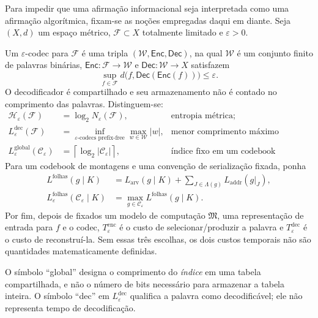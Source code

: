 Para impedir que uma afirmação informacional seja interpretada como uma
afirmação algorítmica, fixam-se as noções empregadas daqui em diante. Seja
$(X,d)$ um espaço métrico, $\mathcal F\subset X$ totalmente limitado e
$\varepsilon>0$.

\begin{definition}\label{map:artigo_2:3.19}\label{artigo_2:def:coding-resources}
Um $\varepsilon$-codec para $\mathcal F$ é uma tripla
$(\mathcal W,\mathsf{Enc},\mathsf{Dec})$, na qual $\mathcal W$ é um conjunto
finito de palavras binárias, $\mathsf{Enc}:\mathcal F\to\mathcal W$ e
$\mathsf{Dec}:\mathcal W\to X$ satisfazem
\[
 \sup_{f\in\mathcal F}d\bigl(f,\mathsf{Dec}(\mathsf{Enc}(f))\bigr)
 \le\varepsilon.
\]
O decodificador é compartilhado e seu armazenamento não é contado no
comprimento das palavras. Distinguem-se:
\begin{align*}
 \mathcal H_\varepsilon(\mathcal F)
  &=\log_2N_\varepsilon(\mathcal F),
  &&\text{entropia métrica;}\\
 L_\varepsilon^{\mathrm{dec}}(\mathcal F)
  &=\inf_{\text{$\varepsilon$-codecs prefix-free}}
    \max_{w\in\mathcal W}|w|,
  &&\text{menor comprimento máximo decodificável;}\\
 L_\varepsilon^{\mathrm{global}}(\mathcal C_\varepsilon)
  &=\left\lceil\log_2|\mathcal C_\varepsilon|\right\rceil,
  &&\text{índice fixo em um codebook compartilhado.}
\end{align*}
Para um codebook de montagens e uma convenção de serialização fixada, ponha
\begin{align*}
 L^{\mathrm{folhas}}(g\mid K)
   &=L_{\mathrm{arv}}(g\mid K)
     +\sum_{J\in\Lambda(g)}L_{\mathrm{addr}}(g|_J),\\
 L_\varepsilon^{\mathrm{folhas}}(\mathcal C_\varepsilon\mid K)
   &=\max_{g\in\mathcal C_\varepsilon}L^{\mathrm{folhas}}(g\mid K).
\end{align*}
Por fim, depois de fixados um modelo de computação $\mathfrak M$, uma
representação de entrada para $f$ e o codec, $T_\varepsilon^{\mathrm{enc}}$
é o custo de selecionar/produzir a palavra e $T_\varepsilon^{\mathrm{dec}}$ é
o custo de reconstruí-la. Sem essas três escolhas, os dois custos temporais
não são quantidades matematicamente definidas.
\end{definition}

O símbolo ``global'' designa o comprimento do \emph{índice} em uma tabela
compartilhada, e não o número de bits necessário para armazenar a tabela inteira.
O símbolo ``dec'' em $L_\varepsilon^{\mathrm{dec}}$ qualifica a palavra como
decodificável; ele não representa tempo de decodificação.


